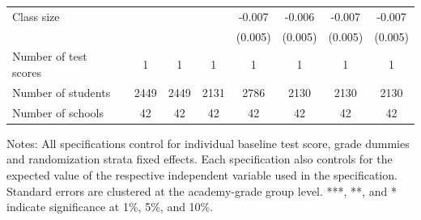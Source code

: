 \begin{center}
\begin{scriptsize}
\begin{threeparttable}
\begin{tabular} {@{} l l c c c c c c c  @{}}
Class size &  &  &  &  & -0.007 & -0.006 & -0.007 & -0.007 \\
                 &  &  &  &  & (0.005) & (0.005) & (0.005) & (0.005) \\
\midrule
Number of test scores &  & 1 & 1 & 1 & 1 & 1 & 1 & 1 \\
Number of students &  & 2449 & 2449 & 2131 & 2786 & 2130 & 2130 & 2130 \\
Number of schools &  & 42 & 42 & 42 & 42 & 42 & 42 & 42 \\
\bottomrule
\end{tabular}
\begin{tablenotes}
\item Notes: All specifications control for individual baseline test score, grade dummies and randomization strata fixed effects. Each specification also controls for the expected value of the respective independent variable used in the specification. Standard errors are clustered at the academy-grade group level. ***, **, and * indicate significance at 1\%, 5\%, and 10\%.\end{tablenotes}
\end{threeparttable}
\end{scriptsize}
\end{center}
\clearpage
